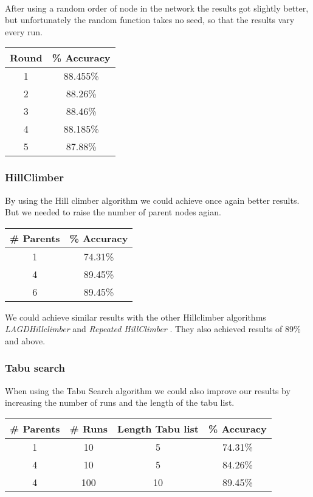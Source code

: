 \documentclass{article}
\begin{document}
\paragraph{}After using a random order of node in the network the results got slightly better, but unfortunately the random function takes no seed, so that the results vary every run.

\begin{center}
\begin{tabular}{ c | c }
\textbf{Round} & \textbf{\% Accuracy} \\
\hline
1  & 88.455\% \\
2  & 88.26\% \\
3  & 88.46\% \\
4  & 88.185\% \\
5  & 87.88\% \\
\end{tabular}
\end{center}

\subsubsection{HillClimber}
By using the Hill climber algorithm we could achieve once again better results. But we needed to raise the number of parent nodes agian.
\begin{center}
\begin{tabular}{ c | c }
\textbf{\# Parents} & \textbf{\% Accuracy} \\
\hline
1  & 74.31\% \\
4  & 89.45\% \\
6  & 89.45\% \\
\end{tabular}
\end{center}

We could achieve similar results with the other Hillclimber algorithms \emph{LAGDHillclimber} and \emph{Repeated HillClimber} . They also achieved results of 89\% and above.

\subsubsection{Tabu search}
When using the Tabu Search algorithm we could also improve our results by increasing the number of runs and the length of the tabu list.
\begin{center}
\begin{tabular}{ c | c  | c | c }
\textbf{\# Parents} & \textbf{\# Runs} & \textbf{Length Tabu list}  & \textbf{\% Accuracy} \\
\hline
1  & 10 & 5 & 74.31\% \\
4  & 10 & 5 & 84.26\% \\
4  & 100 & 10&  89.45\% \\
\end{tabular}
\end{center}
\end{document}
